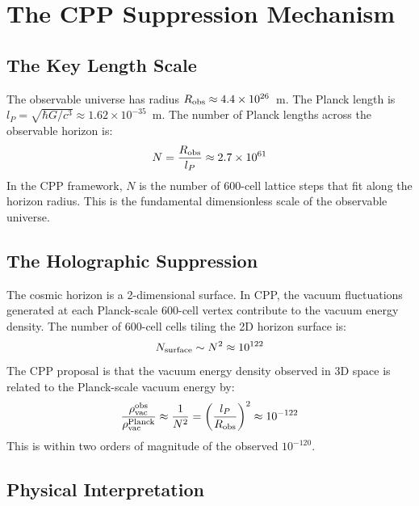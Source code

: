 \documentclass[11pt]{article}
\begin{document}
\section{The CPP Suppression Mechanism}

\subsection{The Key Length Scale}

The observable universe has radius $R_{\rm obs} \approx 4.4 \times 10^{26}$~m.
The Planck length is $l_P = \sqrt{\hbar G/c^3} \approx 1.62 \times 10^{-35}$~m.
The number of Planck lengths across the observable horizon is:
\begin{equation}
N = \frac{R_{\rm obs}}{l_P} \approx 2.7 \times 10^{61}
\label{eq:N}
\end{equation}
In the CPP framework, $N$ is the number of 600-cell lattice steps
that fit along the horizon radius.  This is the fundamental
dimensionless scale of the observable universe.

\subsection{The Holographic Suppression}

The cosmic horizon is a 2-dimensional surface.
In CPP, the vacuum fluctuations generated at each Planck-scale
600-cell vertex contribute to the vacuum energy density.
The number of 600-cell cells tiling the 2D horizon surface is:
\begin{equation}
N_{\rm surface} \sim N^2 \approx 10^{122}
\end{equation}
The CPP proposal is that the vacuum energy density observed in
3D space is related to the Planck-scale vacuum energy by:
\begin{equation}
\frac{\rho_{\rm vac}^{\rm obs}}{\rho_{\rm vac}^{\rm Planck}}
\approx \frac{1}{N^2}
= \left(\frac{l_P}{R_{\rm obs}}\right)^2
\approx 10^{-122}
\label{eq:suppression}
\end{equation}
This is within two orders of magnitude of the observed $10^{-120}$.

\subsection{Physical Interpretation}
\end{document}
